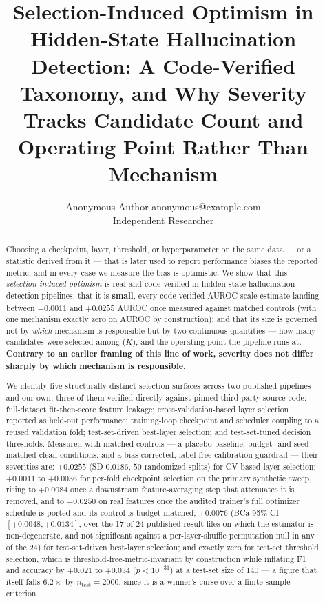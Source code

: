 \documentclass[10pt]{article} %
\title{Selection-Induced Optimism in Hidden-State Hallucination Detection: A
Code-Verified Taxonomy, and Why Severity Tracks Candidate Count and
Operating Point Rather Than Mechanism}
\author{\name Anonymous Author \email anonymous@example.com \\
      \addr Independent Researcher}
\begin{document}
\maketitle


\begin{abstract}

Choosing a checkpoint, layer, threshold, or hyperparameter on the same data
--- or a statistic derived from it --- that is later used to report
performance biases the reported metric, and in every case we measure the bias
is optimistic. We show that this \emph{selection-induced optimism} is real and
code-verified in hidden-state hallucination-detection pipelines; that it is
\textbf{small}, every code-verified AUROC-scale estimate landing between
$+0.0011$ and $+0.0255$ AUROC once measured against matched controls (with
one mechanism exactly zero on AUROC by construction); and that its size is
governed not by \emph{which} mechanism is responsible but by two continuous
quantities --- how many candidates were selected among ($K$), and the
operating point the pipeline runs at. \textbf{Contrary to an earlier framing
of this line of work, severity does not differ sharply by which mechanism is
responsible.}

We identify five structurally distinct selection surfaces across two
published pipelines and our own, three of them verified directly against
pinned third-party source code: full-dataset fit-then-score feature leakage;
cross-validation-based layer selection reported as held-out performance;
training-loop checkpoint and scheduler coupling to a reused validation fold;
test-set-driven best-layer selection; and test-set-tuned decision thresholds.
Measured with matched controls --- a placebo baseline, budget- and
seed-matched clean conditions, and a bias-corrected, label-free calibration
guardrail --- their severities are: $+0.0255$ (SD $0.0186$, $50$ randomized
splits) for CV-based layer selection; $+0.0011$ to $+0.0036$ for per-fold
checkpoint selection on the primary synthetic sweep, rising to $+0.0084$ once
a downstream feature-averaging step that attenuates it is removed, and to
$+0.0250$ on real features once the audited trainer's full optimizer schedule
is ported and its control is budget-matched; $+0.0076$ (BCa 95\% CI
$[+0.0048,+0.0134]$, over the 17 of 24
published result files on which the estimator is non-degenerate, and not
significant against a per-layer-shuffle permutation null in any of the 24) for
test-set-driven best-layer selection; and exactly zero for test-set threshold
selection, which is threshold-free-metric-invariant by construction while
inflating F1 and accuracy by $+0.021$ to $+0.034$ ($p<10^{-31}$) at a
test-set size of $140$ --- a figure that itself falls $6.2\times$ by
$n_{\text{test}}=2000$, since it is a winner's curse over a finite-sample
criterion.


\end{abstract}
\end{document}
